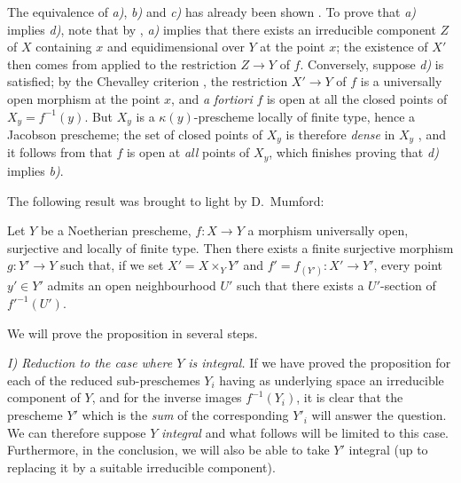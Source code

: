 The equivalence of \emph{a)}, \emph{b)} and \emph{c)} has already been shown .
To prove that \emph{a)} implies \emph{d)}, note that by , \emph{a)} implies that there exists an irreducible component $Z$ of $X$ containing $x$ and equidimensional over $Y$ at the point $x$; the existence of $X'$ then comes from  applied to the restriction $Z\to Y$ of $f$.
Conversely, suppose \emph{d)} is satisfied; by the Chevalley criterion , the restriction $X'\to Y$ of $f$ is a universally open morphism at the point $x$, and \emph{a fortiori} $f$ is open at all the closed points of $X_y=f^{-1}(y)$.
But $X_y$ is a $\kappa(y)$-prescheme locally of finite type, hence a Jacobson prescheme; the set of closed points of $X_y$ is therefore \emph{dense} in $X_y$ , and it follows from  that $f$ is open at \emph{all} points of $X_y$, which finishes proving that \emph{d)} implies \emph{b)}.

The following result was brought to light by D.\ Mumford:

\begin{proposition}[14.5.10]
\label{IV.14.5.10}
Let $Y$ be a Noetherian prescheme, $f:X\to Y$ a morphism universally open, surjective and locally of finite type.
Then there exists a finite surjective morphism $g:Y'\to Y$ such that, if we set $X'=X\times_Y Y'$ and $f'=f_{(Y')}:X'\to Y'$, every point $y'\in Y'$ admits an open neighbourhood $U'$ such that there exists a $U'$-section of $f'^{-1}(U')$.
\end{proposition}

We will prove the proposition in several steps.

\emph{I) Reduction to the case where $Y$ is integral.}
If we have proved the proposition for each of the reduced sub-preschemes $Y_i$ having as underlying space an irreducible component of $Y$, and for the inverse images $f^{-1}(Y_i)$, it is clear that the prescheme $Y'$ which is the \emph{sum} of the corresponding $Y'_i$ will answer the question.
We can therefore suppose $Y$ \emph{integral} and what follows will be limited to this case.
Furthermore, in the conclusion, we will also be able to take $Y'$ integral (up to replacing it by a suitable irreducible component).

